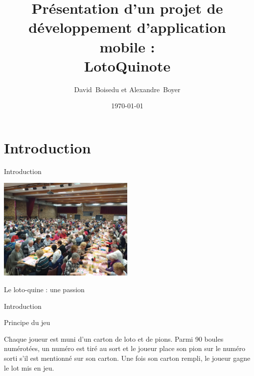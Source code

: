 \documentclass{beamer}
\title[Dev. Mobiles]{Présentation d'un projet de développement d'application mobile :\\LotoQuinote}
\author{David~Boisedu et Alexandre~Boyer}
\institute[]{L3 Informatique}
\date{\today}
\begin{document}

\begin{frame}
    \titlepage
\end{frame}

\section{Introduction}

\begin{frame}{Introduction}
    \begin{center}
        \includegraphics[height=5cm]{Images/lotoquine_evenement.jpg}
    \end{center}
    \begin{center}
        Le loto-quine : une passion
    \end{center}
\end{frame}

\begin{frame}{Introduction}
    \begin{center}
        Principe du jeu
    \end{center}
    \begin{center}
        \begin{semiverbatim}
            Chaque joueur est muni d’un carton de loto et de pions. Parmi 90 boules numérotées, un numéro est tiré au sort et le joueur place son pion sur le numéro sorti s’il est \newline mentionné sur son carton. Une fois son carton rempli, le joueur gagne le lot mis en jeu.
        \end{semiverbatim}
    \end{center}
\end{frame}
\end{document}
